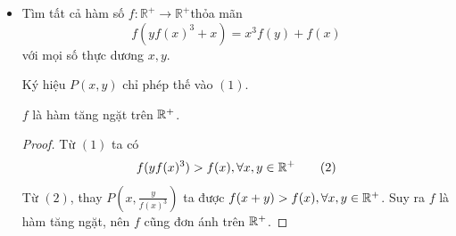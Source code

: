 \documentclass[11pt]{scrartcl}
\begin{document}
\begin{itemize}[label=, leftmargin=0em, itemsep=0.5em]
\begin{sol}
\begin{proof}
                Với $x, y>0$ và $p, q \in \mathbb{Z}^{+}$sao cho $p g(x)-q g(y)>0$, từ các đẳng thức trên ta dễ dàng chứng minh được
                $$
                f(z+p g(x)-q g(y))=f(z)+p h(x)-q h(y)
                $$
                với mọi $z>0$. Nếu $p h(x)-q h(y)<0$, khi đó ta thay $(p, q)$ bởi $(k p, k q)$ với $k$ nguyên dương đủ lớn thì
                $$
                f(z)+p h(x)-q h(y)<0,
                $$
                vố lý. Như vậy
                $$
                p g(x)>q g(y) \Longrightarrow p h(x) \geq q h(y) \quad \forall x, y>0,
                $$
                hay
                $
                \frac{g(x)}{g(y)}>\frac{q}{p} \Longrightarrow \frac{h(x)}{h(y)} \geq \frac{q}{p} \quad \forall x, y>0 .
                $

                Giả sử $\frac{g(x)}{g(y)}>\frac{h(x)}{h(y)}$, khi đó ta có thể chọn $p, q \in \mathbb{Z}^{+}$sao cho
                $ 
                \frac{g(x)}{g(y)}>\frac{q}{p}>\frac{h(x)}{h(y)}
                $
                điều này mâu thuẫn với chứng minh trên. Vậy
                $$
                \frac{h(x)}{h(y)} \geq \frac{g(x)}{g(y)} \Longrightarrow \frac{h(x)}{g(x)} \geq \frac{h(y)}{g(y)} \quad \forall x, y>0 .
                $$

                Thay đổi vai trò $x, y$ trong đánh giá trên ta thu được $\frac{h(x)}{g(x)}=\frac{h(y)}{g(y)}=c \quad \forall x, y>0$.
        \end{proof}
        Trở lại bài toán. Giả sử tồn tại hàm số thỏa mãn.
        Áp dụng bổ đề trên ta suy ra tồn tại số thực dương $c$ sao cho
        $$
        \frac{f(x)}{x}=c \Longrightarrow f(x)=c x \quad \forall x>0
        $$
        Từ đây tìm được $c = 1$. Vậy hàm duy nhất thỏa mãn là $\boxed{f(x) = cx, \xro}$.
    \end{sol}
    \newpage
    \item \begin{bt}
        Tìm tất cả hàm số $f: \mathbb{R}^{+} \rightarrow \mathbb{R}^{+}$thỏa mãn
        \[
        f\left(y f(x)^3+x\right)=x^3 f(y)+f(x)\tag{1}
        \]
        với mọi số thực dương $x, y$.
    \end{bt}
    \begin{sol}
        Ký hiệu $P(x,y)$ chỉ phép thế vào $(1)$.
        
         $f$ là hàm tăng ngặt trên $\mathbb{R^+}$. 
        \begin{proof}
            Từ $(1)$ ta có 
        \[
            f(yf(x)^3) > f(x), \forall x,y \in \mathbb{R^+} \tag{2}
        \]
        Từ $(2)$, thay $P\left(x,\frac{y}{f(x)^3}\right)$ ta được $f(x + y) > f(x), \forall x,y \in \mathbb{R^+}$. Suy ra $f$ là hàm tăng ngặt, nên $f$ cũng đơn ánh trên $\mathbb{R^+}$.
        \end{proof}


\end{sol}
\end{itemize}
\end{document}
